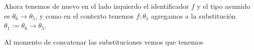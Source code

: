 \documentclass[a4paper,10pt]{article}
\begin{document}
  Ahora tenemos de nuevo en el lado izquierdo el identificador $f$ y el tipo asumido es $\theta_6 \rightarrow \theta_5$,
  y como en el contexto tenemos $f:\theta_1$ agregamos a la substitución $\theta_1 := \theta_6 \rightarrow \theta_5$.
  
  Al momento de concatenar las substituciones vemos que tenemos 
  
  
  
  
   
\end{document}
